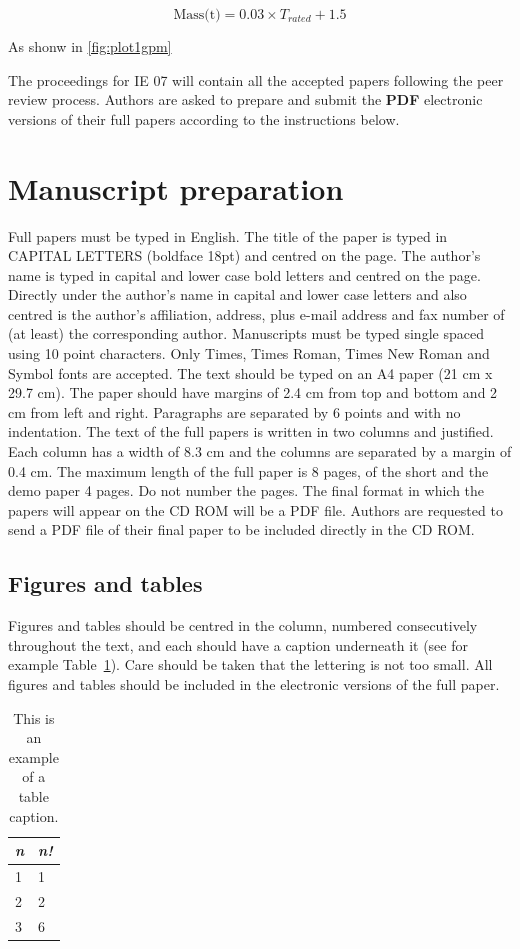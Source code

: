 \documentclass{article}\usepackage{graphicx, color}
\begin{document}
\begin{equation}
  \text{Mass(t)} = 0.03 \times {T_{rated}} + 1.5
\end{equation}

As shonw in \autoref{fig:plot1gpm}

The proceedings for IE 07 will contain all the accepted
papers following the peer review process. Authors are
asked to prepare and submit the {\bf PDF} electronic versions
of their full papers according to the instructions below.

\section{Manuscript preparation}
Full papers must be typed in English. The title of the
paper is typed in CAPITAL LETTERS (boldface 18pt)
and centred on the page. The author's name is typed in
capital and lower case bold letters and centred on the
page. Directly under the author's name in capital and
lower case letters and also centred is the author's
affiliation, address, plus e-mail address and fax number of
(at least) the corresponding author. Manuscripts must be
typed single spaced using 10 point characters. Only
Times, Times Roman, Times New Roman and Symbol
fonts are accepted. The text should be typed on an A4
paper (21 cm x 29.7 cm). The paper should have margins
of 2.4 cm from top and bottom and 2 cm from left and
right. Paragraphs are separated by 6 points and with no
indentation. The text of the full papers is written in two
columns and justified. Each column has a width of 8.3 cm
and the columns are separated by a margin of 0.4 cm. The
maximum length of the full paper is 8 pages, of the short
and the demo paper 4 pages. Do not number the pages.
The final format in which the papers will appear on the
CD ROM will be a PDF file. Authors are requested to send
a PDF file of their final paper to be included directly
in the CD ROM.

\subsection{Figures and tables}
Figures and tables should be centred in the column,
numbered consecutively throughout the text, and each
should have a caption underneath it (see for example
Table~\ref{tab1}). Care should be taken that the lettering
is not too small. All figures and tables should be included
in the electronic versions of the full paper.


\begin{table}[htb!]
\begin{center}

\begin{tabular}{|l|l|}
\hline
{\em n} & {\em n!} \\
\hline
1 & 1  \\
2 & 2  \\
3  & 6\\
\hline
\end{tabular}
\end{center}
\caption{\label{tab1}This is an example of a table caption.}
\end{table}
\end{document}

